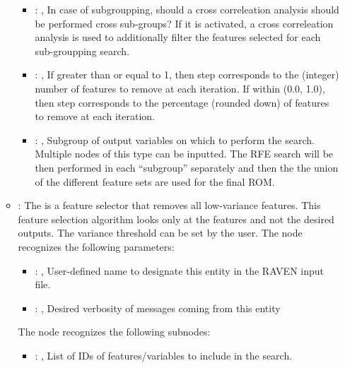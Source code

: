 \begin{itemize}
\begin{itemize}
\begin{itemize}
            \item {}: ,
              In case of subgroupping, should a cross correleation analysis should be performed
              cross sub-groups?         If it is activated, a cross correleation analysis is used to
              additionally filter the features selected for each         sub-groupping search.

            \item {}: ,
              If greater than or equal to 1, then step corresponds to the (integer) number
              of features to remove at each iteration. If within (0.0, 1.0), then step
              corresponds to the percentage (rounded down) of features to remove at         each
              iteration.

            \item {}: ,
              Subgroup of output variables on which to perform the search. Multiple nodes of this
              type can be inputted. The RFE search will be then performed in each ``subgroup''
              separately and then the the union of the different feature sets are used for the final
              ROM.
          \end{itemize}

        \item {}:
          The  is a feature selector that removes     all low-variance
          features. This feature selection algorithm looks only at the features and not     the
          desired outputs. The variance threshold can be set by the user.
          The  node recognizes the following parameters:
            \begin{itemize}
              \item {}: ,
                User-defined name to designate this entity in the RAVEN input file.
              \item {}: ,
                Desired verbosity of messages coming from this entity
          \end{itemize}

          The  node recognizes the following subnodes:
          \begin{itemize}
            \item {}: ,
              List of IDs of features/variables to include in the search.


\end{itemize}
\end{itemize}
\end{itemize}
